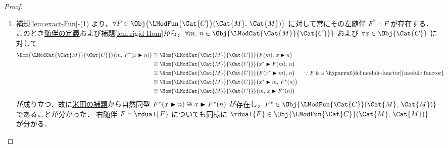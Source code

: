 \documentclass[TQFT_main]{subfiles}
\begin{document}
\begin{proof}
\begin{enumerate}
        \item 補題\ref{lem:exact-Fun}-(1) より，$\forall F \in \Obj{\LModFun{\Cat{C}} (\Cat{M},\, \Cat{M})}$ に対して常にその左随伴 $F^* \dashv F$ が存在する．
        このとき\hyperref[def:adjoint]{随伴の定義}および補題\ref{lem:rigid-Hom}から，$\forall m,\, n \in \Obj{\LModCat{\Cat{M}}{\Cat{C}}}$ および $\forall x\in \Obj{\Cat{C}}$ に対して
        \begin{align}
            \Hom{\LModCat{\Cat{M}}{\Cat{C}}} \bigl(m,\, F^*(x \btr n)\bigr)
            &\cong \Hom{\LModCat{\Cat{M}}{\Cat{C}}} \bigl(F(m),\, x \btr n\bigr) \\
            &\cong \Hom{\LModCat{\Cat{M}}{\Cat{C}}} \bigl(x^* \btr F(m),\, n\bigr) \\
            &\cong \Hom{\LModCat{\Cat{M}}{\Cat{C}}} \bigl(F(x^* \btr m),\, n\bigr) &&\because F\; \text{is a \hyperref[def:module-functor]{module functor}} \\
            &\cong \Hom{\LModCat{\Cat{M}}{\Cat{C}}} \bigl(x^* \btr m,\, F^*(n)\bigr) \\
            &\cong \Hom{\LModCat{\Cat{M}}{\Cat{C}}} \bigl(m,\, x \btr F^*(n)\bigr)
        \end{align}
        が成り立つ．故に\hyperref[col:Yoneda]{米田の補題}から自然同型 $F^* (x \blacktriangleright n) \cong x \blacktriangleright F^*(n)$ が存在し，$F^* \in \Obj{\LModFun{\Cat{C}} (\Cat{M},\, \Cat{M})}$ であることが分かった．
        右随伴 $F \vdash \rdual{F}$ についても同様に $\rdual{F} \in \Obj{\LModFun{\Cat{C}} (\Cat{M},\, \Cat{M})}$ が分かる．


\end{enumerate}
\end{proof}
\end{document}
